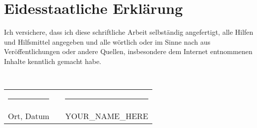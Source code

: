 \newpage

\section*{Eidesstaatliche Erklärung}

Ich versichere, dass ich diese schriftliche Arbeit selbständig angefertigt, alle Hilfen und Hilfsmittel angegeben und alle wörtlich oder im Sinne nach aus Veröffentlichungen oder andere Quellen, insbesondere dem Internet entnommenen Inhalte kenntlich gemacht habe.

\begin{verbatim}


\end{verbatim}

\noindent
\begin{tabular}{lcl}
\rule{5cm}{0.5pt} & \hspace{2cm} & \rule{5cm}{0.5pt} \\
Ort, Datum & & YOUR\_NAME\_HERE
\end{tabular}